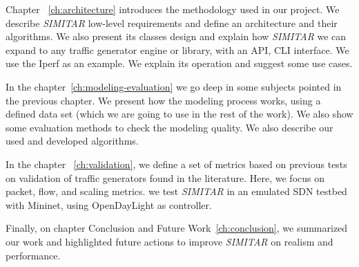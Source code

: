 Chapter ~\ref{ch:architecture} introduces the methodology used in our project. We describe \textit{SIMITAR} low-level requirements and define an architecture and their algorithms.  We also present its classes design and explain how \textit{SIMITAR} we can expand to any traffic generator engine or library, with an API, CLI interface. We use the Iperf as an example. We explain its operation and suggest some use cases.

In the chapter~\ref{ch:modeling-evaluation} we go deep in some subjects pointed in the previous chapter. We present how the modeling process works, using a defined data set (which we are going to use in the rest of the work). We also show some evaluation methods to check the modeling quality. We also describe our used and developed algorithms.

In the chapter ~\ref{ch:validation}, we define a set of metrics based on previous tests on validation of traffic generators found in the literature. Here, we focus on packet, flow, and scaling metrics. we test \textit{SIMITAR} in an emulated SDN testbed with Mininet, using OpenDayLight as controller\cite{web-opendaylight}. 


Finally, on chapter Conclusion and Future Work~\ref{ch:conclusion}, we summarized our work and highlighted future actions to improve \textit{SIMITAR} on realism and performance.

